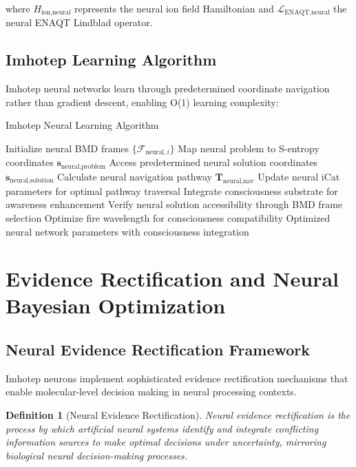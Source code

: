 \documentclass[12pt,a4paper]{article}
\newtheorem{definition}[theorem]{Definition}
\theoremstyle{remark}
\begin{document}
where $H_{\text{ion,neural}}$ represents the neural ion field Hamiltonian and $\mathcal{L}_{\text{ENAQT,neural}}$ the neural ENAQT Lindblad operator.

\subsection{Imhotep Learning Algorithm}

Imhotep neural networks learn through predetermined coordinate navigation rather than gradient descent, enabling O(1) learning complexity:

\begin{algorithm}
\caption{Imhotep Neural Learning Algorithm}
\begin{algorithmic}[1]
\STATE Initialize neural BMD frames $\{\mathcal{F}_{\text{neural},i}\}$
\STATE Map neural problem to S-entropy coordinates $\mathbf{s}_{\text{neural,problem}}$
\STATE Access predetermined neural solution coordinates $\mathbf{s}_{\text{neural,solution}}$
\STATE Calculate neural navigation pathway $\mathbf{T}_{\text{neural,nav}}$
\STATE Update neural iCat parameters for optimal pathway traversal
\STATE Integrate consciousness substrate for awareness enhancement
\STATE Verify neural solution accessibility through BMD frame selection
\STATE Optimize fire wavelength for consciousness compatibility
\RETURN Optimized neural network parameters with consciousness integration
\end{algorithmic}
\end{algorithm}

\section{Evidence Rectification and Neural Bayesian Optimization}

\subsection{Neural Evidence Rectification Framework}

Imhotep neurons implement sophisticated evidence rectification mechanisms that enable molecular-level decision making in neural processing contexts.

\begin{definition}[Neural Evidence Rectification]
Neural evidence rectification is the process by which artificial neural systems identify and integrate conflicting information sources to make optimal decisions under uncertainty, mirroring biological neural decision-making processes.
\end{definition}
\end{document}
